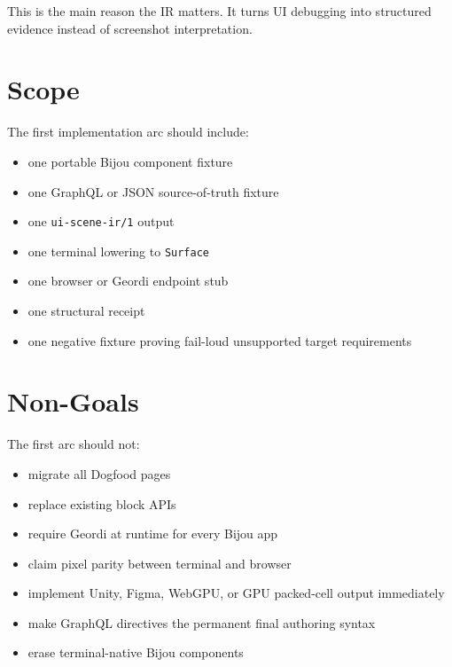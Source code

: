 This is the main reason the IR matters. It turns UI debugging into structured evidence instead of screenshot interpretation.

\section{Scope}\label{record-139-scope}

The first implementation arc should include:

\begin{itemize}
\tightlist
\item
  one portable Bijou component fixture
\item
  one GraphQL or JSON source-of-truth fixture
\item
  one \texttt{u\allowbreak{}i\allowbreak{}-\allowbreak{}s\allowbreak{}c\allowbreak{}e\allowbreak{}n\allowbreak{}e\allowbreak{}-\allowbreak{}i\allowbreak{}r\allowbreak{}/\allowbreak{}1} output
\item
  one terminal lowering to \texttt{S\allowbreak{}u\allowbreak{}r\allowbreak{}f\allowbreak{}a\allowbreak{}c\allowbreak{}e}
\item
  one browser or Geordi endpoint stub
\item
  one structural receipt
\item
  one negative fixture proving fail-loud unsupported target requirements
\end{itemize}

\section{Non-Goals}\label{record-139-non-goals}

The first arc should not:

\begin{itemize}
\tightlist
\item
  migrate all Dogfood pages
\item
  replace existing block APIs
\item
  require Geordi at runtime for every Bijou app
\item
  claim pixel parity between terminal and browser
\item
  implement Unity, Figma, WebGPU, or GPU packed-cell output immediately
\item
  make GraphQL directives the permanent final authoring syntax
\item
  erase terminal-native Bijou components
\end{itemize}

